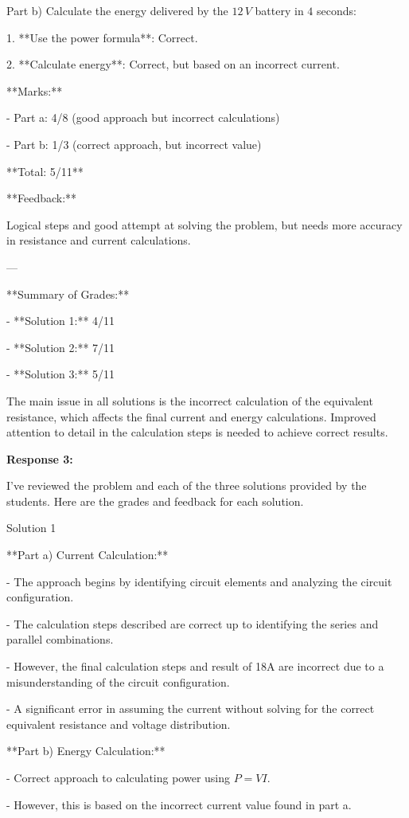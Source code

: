 \documentclass[a4paper,11pt]{article}
\begin{document}
Part b) Calculate the energy delivered by the \(12\,V\) battery in \(4\) seconds:

1. **Use the power formula**: Correct.

2. **Calculate energy**: Correct, but based on an incorrect current.

**Marks:**

- Part a: 4/8 (good approach but incorrect calculations)

- Part b: 1/3 (correct approach, but incorrect value)

**Total: 5/11**

**Feedback:**

Logical steps and good attempt at solving the problem, but needs more accuracy in resistance and current calculations.

---

**Summary of Grades:**

- **Solution 1:** 4/11

- **Solution 2:** 7/11

- **Solution 3:** 5/11

The main issue in all solutions is the incorrect calculation of the equivalent resistance, which affects the final current and energy calculations. Improved attention to detail in the calculation steps is needed to achieve correct results.

\bigskip 
\textbf{Response 3:}

I've reviewed the problem and each of the three solutions provided by the students. Here are the grades and feedback for each solution.

Solution 1

**Part a) Current Calculation:**

- The approach begins by identifying circuit elements and analyzing the circuit configuration.

- The calculation steps described are correct up to identifying the series and parallel combinations.

- However, the final calculation steps and result of 18A are incorrect due to a misunderstanding of the circuit configuration.

- A significant error in assuming the current without solving for the correct equivalent resistance and voltage distribution.

**Part b) Energy Calculation:**

- Correct approach to calculating power using \( P = VI \).

- However, this is based on the incorrect current value found in part a.
\end{document}
